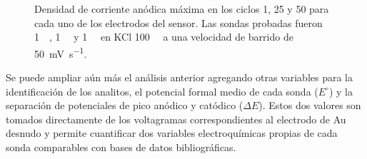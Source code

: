 \begin{figure}[b!]
\begin{subfigure}[t]{0.495\textwidth}
		 	   \end{subfigure}
		      	\caption[Corriente de pico en distintos ciclos voltamperometricos]{Densidad de corriente anódica máxima en los ciclos 1, 25 y 50 para cada uno de los electrodos del sensor. Las sondas probadas fueron \fc \SI{1}{\milli\Molar}, \fe\space \SI{1}{\milli\Molar} y \ru\space \SI{1}{\milli\Molar} en KCl \SI{100}{\milli\Molar} a una velocidad de barrido de \SI{50}{\milli\volt\per\second}.}
		      	\label{fig:barras}
		      	\end{figure}
     	
	 Se puede ampliar aún más el análisis anterior agregando otras variables para la identificación de los analitos, el potencial formal medio de cada sonda ($E^{\circ}$) y la separación de potenciales de pico anódico y catódico ($\Delta E$). Estos dos valores son tomados directamente de los voltagramas correspondientes al electrodo de Au desnudo y permite cuantificar dos variables electroquímicas propias de cada sonda comparables con bases de datos bibliográficas.
